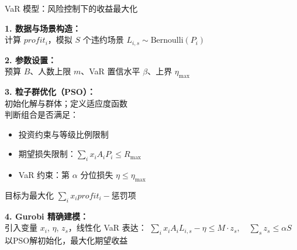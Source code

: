 \documentclass{write_paper}
\begin{document}
 \begin{algorithm}[htbp]  \footnotesize
\caption{VaR 模型：风险控制下的收益最大化}
\label{alg:var_model}

\textbf{1. 数据与场景构造：} \\
计算 $profit_i$，模拟 $S$ 个违约场景 $L_{i,s} \sim \text{Bernoulli}(P_i)$

\textbf{2. 参数设置：} \\
预算 $B$、人数上限 $m$、VaR 置信水平 $\beta$、上界 $\eta_{\max}$

\textbf{3. 粒子群优化（PSO）：} \\
初始化解与群体；定义适应度函数 \\
判断组合是否满足：
\begin{itemize}
  \item 投资约束与等级比例限制
  \item 期望损失限制：$\sum_i x_i A_i P_i \leq R_{\max}$
  \item VaR 约束：第 $\alpha$ 分位损失 $\eta \leq \eta_{\max}$
\end{itemize}
目标为最大化 $\sum_i x_i profit_i - \text{惩罚项}$

\textbf{4. Gurobi 精确建模：} \\
引入变量 $x_i$, $\eta$, $z_s$，线性化 VaR 表达：
\(
\sum_i x_i A_i L_{i,s} - \eta \leq M \cdot z_s,\quad \sum_s z_s \leq \alpha S
\)
以PSO解初始化，最大化期望收益
\end{algorithm}
\end{document}
